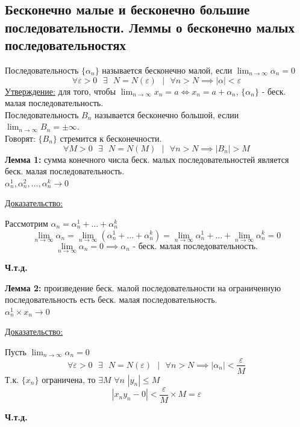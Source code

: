 \documentclass[12pt]{article}
\begin{document}
    \subsection{Бесконечно малые и бесконечно большие последовательности. Леммы о бесконечно малых последовательностях}\noindent
    Последовательность $\{\alpha_n\}$ называется бесконечно малой, если $\lim_{n\to\infty} \alpha_n = 0$
    \[\forall \varepsilon > 0 \text{ } \exists \text{ } N = N(\varepsilon) \text{ } \big| \text{ } \forall n > N \implies |\alpha| < \varepsilon\]
    \underline{Утверждение:} для того, чтобы $\lim_{n\to\infty} x_n = a \Leftrightarrow x_n = a + \alpha_n$, $\{\alpha_n\}$ - беск. малая последовательность.\\
    Последовательность $B_n$ называется бесконечно большой, еслии $\lim_{n\to\infty} B_n = \pm\infty$.\\
    Говорят: $\{B_n\}$ стремится к бесконечности.
    \[\forall M > 0 \text{ } \exists \text{ } N = N(M) \text{ } \big| \text{ } \forall n > N \implies |B_n| > M\]
    \textbf{Лемма 1:} сумма конечного числа беск. малых последовательностей является беск. малая последовательность.\\
    $\alpha_n^1, \alpha_n^2, \dots, \alpha_n^k \to 0$\par\noindent
    \underline{Доказательство:}\par
    \begin{adjustwidth}{1.5em}{1.5em}
        Рассмотрим $\alpha_n = \alpha_n^1 + \dots + \alpha_n^k$\\
        \[ \lim_{n\to\infty} \alpha_n = \lim_{n\to\infty}(\alpha_n^1 + \dots + \alpha_n^k) = \lim_{n\to\infty}\alpha_n^1 + \dots + \lim_{n\to\infty}\alpha_n^k = 0 \]
        \[ \lim_{n\to\infty} \alpha_n = 0 \implies \alpha_n \text{ - беск. малая последовательность.} \]
        \begin{center}
            \textbf{Ч.т.д.}
        \end{center}
    \end{adjustwidth}
    \textbf{Лемма 2:} произведение беск. малой последовательности на ограниченную последовательность есть беск. малая последовательность.\\
    $\alpha_n^1 \times x_n \to 0$\par\noindent
    \underline{Доказательство:}
    \begin{adjustwidth}{1.5em}{1.5em}
        Пусть $\lim_{n\to\infty}\alpha_n = 0$
        \[ \forall \varepsilon > 0 \text{ } \exists \text{ } N = N(\varepsilon) \text{ } \big| \text{ } \forall n > N \implies |\alpha_{n}| < \frac{\varepsilon}{M} \]
        Т.к. $\{x_n\}$ ограничена, то $\exists M$ $\forall n$ $|y_n| \le M$
        \[ |x_ny_n - 0| < \frac{\varepsilon}{M} \times M = \varepsilon \]
        \begin{center}
            \textbf{Ч.т.д.}
        \end{center}
    \end{adjustwidth}
\end{document}
